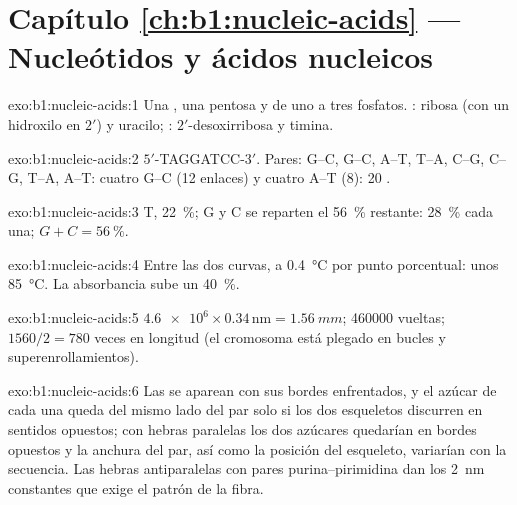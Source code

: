 \section*{Capítulo \ref{ch:b1:nucleic-acids} --- Nucleótidos y ácidos nucleicos}

\begin{solution}{exo:b1:nucleic-acids:1}
Una , una pentosa y de uno a tres fosfatos. : ribosa (con
un hidroxilo en $2'$) y uracilo; : $2'$-desoxirribosa y timina.
\end{solution}

\begin{solution}{exo:b1:nucleic-acids:2}
$5'$-TAGGATCC-$3'$. Pares: G--C, G--C, A--T, T--A, C--G, C--G, T--A,
A--T: cuatro G--C (12 enlaces) y cuatro A--T (8): 20 .
\end{solution}

\begin{solution}{exo:b1:nucleic-acids:3}
T, \qty{22}{\%}; G y C se reparten el \qty{56}{\%} restante: \qty{28}{\%}
cada una; $G + C = \qty{56}{\%}$.
\end{solution}

\begin{solution}{exo:b1:nucleic-acids:4}
Entre las dos curvas, a \qty{0.4}{\celsius} por punto porcentual: unos
\qty{85}{\celsius}. La absorbancia sube un \qty{40}{\%}.
\end{solution}

\begin{solution}{exo:b1:nucleic-acids:5}
$\num{4.6e6}\times 0.34\,\mathrm{nm} = \qty{1.56}{mm}$; \num{460000}
vueltas; $1560/2 = 780$ veces en longitud (el cromosoma está plegado en
bucles y superenrollamientos).
\end{solution}

\begin{solution}{exo:b1:nucleic-acids:6}
Las  se aparean con sus bordes enfrentados, y el azúcar de cada una
queda del mismo lado del par solo si los dos esqueletos discurren en
sentidos opuestos; con hebras paralelas los dos azúcares quedarían en bordes
opuestos y la anchura del par, así como la posición del esqueleto, variarían
con la secuencia. Las hebras antiparalelas con pares purina--pirimidina dan
los \qty{2}{nm} constantes que exige el patrón de la fibra.
\end{solution}

